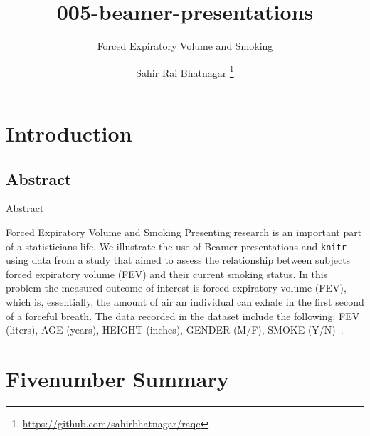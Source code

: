 \documentclass[10pt]{beamer}\usepackage[]{graphicx}\usepackage[]{color}
\begin{document}
\title[005-beamer-presentations]{005-beamer-presentations}
\subtitle{Forced Expiratory Volume and Smoking}

\author[]{Sahir Rai Bhatnagar%
\thanks{\href{https://github.com/sahirbhatnagar/raqc}{https://github.com/sahirbhatnagar/raqc}%
}}




\maketitle

\section{Introduction}

\subsection{Abstract}

\begin{frame}{Abstract}
\begin{exampleblock}{Forced Expiratory Volume and Smoking}
Presenting research is an important part of a statisticians life. We illustrate the use of Beamer presentations and \texttt{knitr}~\citep{k1,k2,k3} using data from a study that aimed to assess the relationship between subjects forced expiratory volume (FEV) and their current smoking status. In this problem the measured outcome of interest is forced expiratory volume (FEV), which is, essentially, the amount of air an individual can exhale in the first second of a forceful breath. The data recorded in the dataset include the following: FEV (liters), AGE (years), HEIGHT (inches), GENDER (M/F), SMOKE (Y/N)~\citep{kahn2005exhalent}. 
\end{exampleblock}
\end{frame}

\section{Fivenumber Summary}
\end{document}
